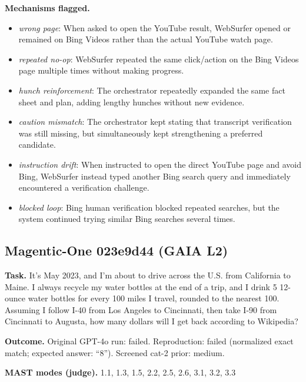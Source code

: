 \textbf{Mechanisms flagged.}
\begin{itemize}
  \item \emph{wrong page}: When asked to open the YouTube result, WebSurfer opened or remained on Bing Videos rather than the actual YouTube watch page.
  \item \emph{repeated no-op}: WebSurfer repeated the same click/action on the Bing Videos page multiple times without making progress.
  \item \emph{hunch reinforcement}: The orchestrator repeatedly expanded the same fact sheet and plan, adding lengthy hunches without new evidence.
  \item \emph{caution mismatch}: The orchestrator kept stating that transcript verification was still missing, but simultaneously kept strengthening a preferred candidate.
  \item \emph{instruction drift}: When instructed to open the direct YouTube page and avoid Bing, WebSurfer instead typed another Bing search query and immediately encountered a verification challenge.
  \item \emph{blocked loop}: Bing human verification blocked repeated searches, but the system continued trying similar Bing searches several times.
\end{itemize}

\subsection*{Magentic-One 023e9d44 (GAIA L2)}
\textbf{Task.} It's May 2023, and I'm about to drive across the U.S. from California to Maine. I always recycle my water bottles at the end of a trip, and I drink 5 12-ounce water bottles for every 100 miles I travel, rounded to the nearest 100. Assuming I follow I-40 from Los Angeles to Cincinnati, then take I-90 from Cincinnati to Augusta, how many dollars will I get back according to Wikipedia?

\textbf{Outcome.} Original GPT-4o run: failed. Reproduction: failed (normalized exact match; expected answer: ``8''). Screened cat-2 prior: medium.

\textbf{MAST modes (judge).} 1.1, 1.3, 1.5, 2.2, 2.5, 2.6, 3.1, 3.2, 3.3

